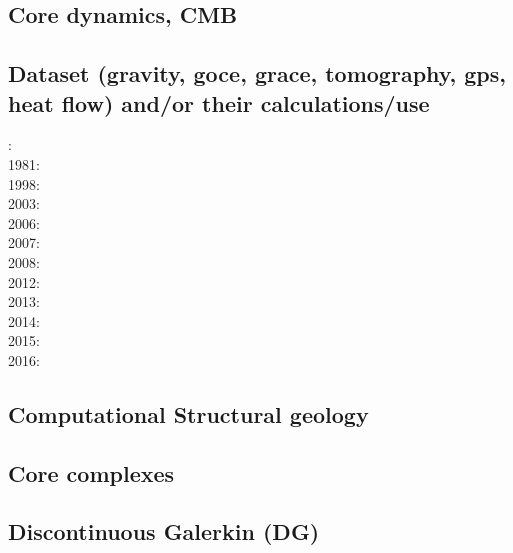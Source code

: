 \subsection*{Core dynamics, CMB}

\noindent
\cite{hayu96}
\cite{lahb08}\cite{gost08}

\subsection*{Dataset (gravity, goce, grace, tomography, gps, heat flow) 
and/or their calculations/use}

: \cite{rola77}\\
1981: \cite{dzan81}\\
1998: \cite{bisp98}\\
2003: \cite{krhh03}\cite{sosi03}\\
2006: \cite{masr06}\\
2007: \cite{mitk07}\\
2008: \cite{zhou08}\cite{zhou08}\\
2012: \cite{hawj12}\cite{resa12}\cite{hawj12}\cite{fesw12}\\
2013: \cite{ress13}\cite{ebbf13}\cite{davi13}\\
2014: \cite{paml14}\cite{ebbf14}\cite{krbk14}\\
2015: \cite{boem15}\cite{brrs15}\\
2016: \cite{kord16}

\subsection*{Computational Structural geology}

\noindent
\cite{fige95}
\cite{acgf00}
\cite{trla00}
\cite{masc01}
\cite{manc08}
\cite{frem11}
\cite{naam17}


\subsection*{Core complexes}

\noindent
\cite{lehm12}

\subsection*{Discontinuous Galerkin (DG)}

